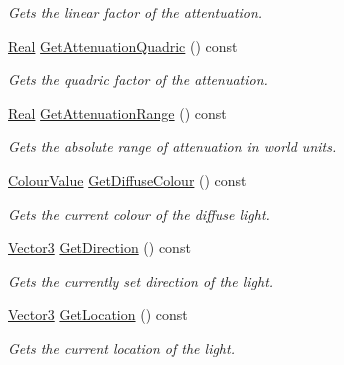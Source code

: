 \begin{DoxyCompactItemize}
\begin{DoxyCompactList}\small\item\em Gets the linear factor of the attentuation. \item\end{DoxyCompactList}\item 
\hyperlink{namespacephys_af7eb897198d265b8e868f45240230d5f}{Real} \hyperlink{classphys_1_1Light_a4ea9693e7ba3f4b6199f132b29e645fa}{GetAttenuationQuadric} () const 
\begin{DoxyCompactList}\small\item\em Gets the quadric factor of the attenuation. \item\end{DoxyCompactList}\item 
\hyperlink{namespacephys_af7eb897198d265b8e868f45240230d5f}{Real} \hyperlink{classphys_1_1Light_ad113608997af66646ed91c28acb9057c}{GetAttenuationRange} () const 
\begin{DoxyCompactList}\small\item\em Gets the absolute range of attenuation in world units. \item\end{DoxyCompactList}\item 
\hyperlink{classphys_1_1ColourValue}{ColourValue} \hyperlink{classphys_1_1Light_a75d4d4c33bf0f552e48f280a80dc5fb4}{GetDiffuseColour} () const 
\begin{DoxyCompactList}\small\item\em Gets the current colour of the diffuse light. \item\end{DoxyCompactList}\item 
\hyperlink{classphys_1_1Vector3}{Vector3} \hyperlink{classphys_1_1Light_afde81fca535417fdb33d23d38117ccac}{GetDirection} () const 
\begin{DoxyCompactList}\small\item\em Gets the currently set direction of the light. \item\end{DoxyCompactList}\item 
\hyperlink{classphys_1_1Vector3}{Vector3} \hyperlink{classphys_1_1Light_ad3610013689db17cb21e89af2786fb3d}{GetLocation} () const 
\begin{DoxyCompactList}\small\item\em Gets the current location of the light. \item\end{DoxyCompactList}\item 

\end{DoxyCompactItemize}
